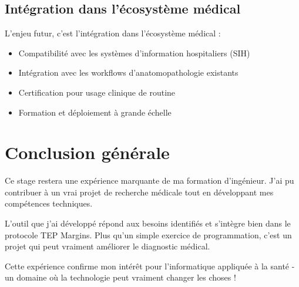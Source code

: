 \documentclass[11pt,a4paper]{report}
\begin{document}
\subsection{Intégration dans l'écosystème médical}

L'enjeu futur, c'est l'intégration dans l'écosystème médical :

\begin{itemize}
\item Compatibilité avec les systèmes d'information hospitaliers (SIH)
\item Intégration avec les workflows d'anatomopathologie existants
\item Certification pour usage clinique de routine
\item Formation et déploiement à grande échelle
\end{itemize}

\section{Conclusion générale}

Ce stage restera une expérience marquante de ma formation d'ingénieur. J'ai pu contribuer à un vrai projet de recherche médicale tout en développant mes compétences techniques.

L'outil que j'ai développé répond aux besoins identifiés et s'intègre bien dans le protocole TEP Margins. Plus qu'un simple exercice de programmation, c'est un projet qui peut vraiment améliorer le diagnostic médical.

Cette expérience confirme mon intérêt pour l'informatique appliquée à la santé - un domaine où la technologie peut vraiment changer les choses !
\end{document}
